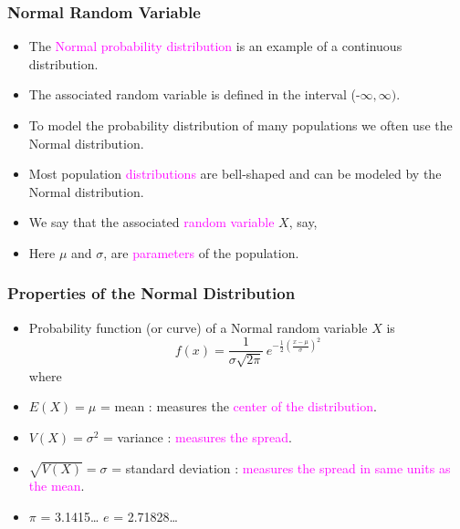 \documentclass[xcolor=dvipsnames,12pt]{beamer}
\begin{document}
\begin{frame}
\frametitle{Normal Random Variable}
\begin{itemize}
\item The \textcolor{magenta}{Normal probability distribution} is an
example of a  continuous distribution. 
\item The associated random
variable is defined in the interval (-$\infty,\infty)$.
\item To model the probability distribution of many  populations
we often use the Normal distribution. 
\item Most population \textcolor{magenta}{distributions} are bell-shaped and can be
modeled by the Normal distribution. 
\item We say that
the  associated \textcolor{magenta}{random variable} $X$, say, \\
\item Here $\mu$ and $\sigma$, are \textcolor{magenta}{parameters}
of the population. 
\end{itemize}
\end{frame}

\begin{frame}
\frametitle{Properties of the Normal Distribution}
\begin{itemize}
\item Probability function (or curve) of a
Normal random variable $X$ is
\begin{equation*}
  f(x) = \frac{1}{\sigma \sqrt{2\pi}} \, e^{- \frac{1}{2} \left(\frac{x-\mu}{\sigma}\right)^2}
\end{equation*}
where

\item $E(X)= \mu$ = mean : measures the \textcolor{magenta}{center of the distribution}.

\item $V(X)= \sigma^2$ = variance : \textcolor{magenta}{measures the spread}.

\item $\sqrt{V(X)}= \sigma$ = standard deviation : \textcolor{magenta}{measures the spread in
same units as the mean}.
\item $\pi$ = 3.1415\ldots \hspace*{3mm} $e$ = 2.71828\ldots
\end{itemize}
\end{frame}
\end{document}
